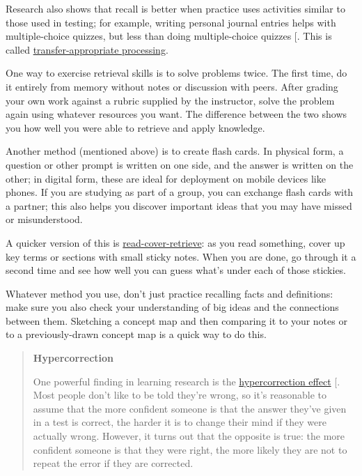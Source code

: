 Research also shows that recall is better when practice uses
activities similar to those used in testing; for example, writing
personal journal entries helps with multiple-choice quizzes, but less
than doing multiple-choice quizzes {[}\protect[\hyperlink{b:Mill2016a}{Mill2016a}]{]}. This is
called \protect\hyperlink{g:transfer-appropriate-processing}{transfer-appropriate
processing}.

One way to exercise retrieval skills is to solve problems twice. The
first time, do it entirely from memory without notes or discussion with
peers. After grading your own work against a rubric supplied by the
instructor, solve the problem again using whatever resources you want.
The difference between the two shows you how well you were able to
retrieve and apply knowledge.

Another method (mentioned above) is to create flash cards. In physical
form, a question or other prompt is written on one side, and the answer
is written on the other; in digital form, these are ideal for deployment
on mobile devices like phones. If you are studying as part of a group,
you can exchange flash cards with a partner; this also helps you
discover important ideas that you may have missed or misunderstood.

A quicker version of this is
\protect\hyperlink{g:read-cover-retrieve}{read-cover-retrieve}: as you read something,
cover up key terms or sections with small sticky notes. When you are
done, go through it a second time and see how well you can guess
what's under each of those stickies.

Whatever method you use, don't just practice recalling facts and
definitions: make sure you also check your understanding of big ideas
and the connections between them. Sketching a concept map and then
comparing it to your notes or to a previously-drawn concept map is a
quick way to do this.

\begin{quote}\setlength{\parindent}{0pt}
\textbf{Hypercorrection}

One powerful finding in learning research is the \protect\hyperlink{g:hypercorrection}{hypercorrection
effect} {[}\protect[\hyperlink{b:Metc2016}{Metc2016}]{]}. Most people don't
like to be told they're wrong, so it's reasonable to assume that the
more confident someone is that the answer they've given in a test is
correct, the harder it is to change their mind if they were actually
wrong. However, it turns out that the opposite is true: the more
confident someone is that they were right, the more likely they are
not to repeat the error if they are corrected.
\end{quote}

